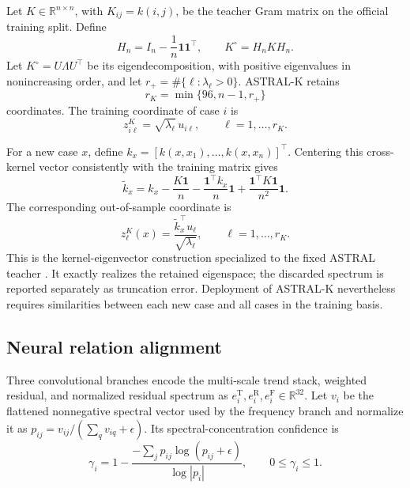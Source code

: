 \documentclass[pdflatex,sn-mathphys-num]{sn-jnl}
\newcommand{\1}{\mathbf{1}}
\theoremstyle{plain}
\begin{document}
	Let $K\in\mathbb{R}^{n\times n}$, with $K_{ij}=k(i,j)$, be the teacher Gram matrix on the official training split. Define
	\begin{equation}
		H_n
		=
		I_n-\frac{1}{n}\mathbf{1}\mathbf{1}^{\top},
		\qquad
		K^\circ
		=
		H_nKH_n.
		\label{eq:centeredkernel}
	\end{equation}
	Let $K^\circ=U\Lambda U^\top$ be its eigendecomposition, with positive eigenvalues in nonincreasing order, and let $r_+=\#\{\ell:\lambda_\ell>0\}$. ASTRAL-K retains
	\begin{equation}
		r_K
		=
		\min\{96,n-1,r_+\}
		\label{eq:retainedrank}
	\end{equation}
	coordinates. The training coordinate of case $i$ is
	\begin{equation}
		z^K_{i\ell}
		=
		\sqrt{\lambda_\ell}\,u_{i\ell},
		\qquad
		\ell=1,\ldots,r_K.
		\label{eq:traincoord}
	\end{equation}
	
	For a new case $x$, define $k_x=[k(x,x_1),\ldots,k(x,x_n)]^\top$. Centering this cross-kernel vector consistently with the training
	matrix gives
	\begin{equation}
		\widetilde k_x
		=
		k_x
		-\frac{K\mathbf{1}}{n}
		-\frac{\mathbf{1}^\top k_x}{n}\mathbf{1}
		+\frac{\mathbf{1}^\top K\mathbf{1}}{n^2}\mathbf{1}.
		\label{eq:centeredoos}
	\end{equation}
	The corresponding out-of-sample coordinate is
	\begin{equation}
		z^K_\ell(x)
		=
		\frac{\widetilde k_x^\top u_\ell}
		{\sqrt{\lambda_\ell}},
		\qquad
		\ell=1,\ldots,r_K.
		\label{eq:oos}
	\end{equation}
	This is the kernel-eigenvector construction specialized to the fixed
	ASTRAL teacher \cite{scholkopf1998kpca}. It exactly realizes the
	retained eigenspace; the discarded spectrum is reported separately as
	truncation error. Deployment of ASTRAL-K nevertheless requires
	similarities between each new case and all cases in the training basis.
	
	\subsection{Neural relation alignment}
	
	Three convolutional branches encode the multi-scale trend stack, weighted residual, and normalized residual spectrum as $e_i^{\mathrm{T}},e_i^{\mathrm{R}},e_i^{\mathrm{F}}\in\mathbb{R}^{32}$.
	Let $v_i$ be the flattened nonnegative spectral vector used by the
	frequency branch and normalize it as $p_{ij}=v_{ij}/(\sum_qv_{iq}+\epsilon)$. Its spectral-concentration confidence is
	\begin{equation}
		\gamma_i
		=
		1-
		\frac{
			-\sum_jp_{ij}\log(p_{ij}+\epsilon)
		}{
			\log |p_i|
		},
		\qquad
		0\leq\gamma_i\leq1.
		\label{eq:confidence}
	\end{equation}
	
\end{document}
